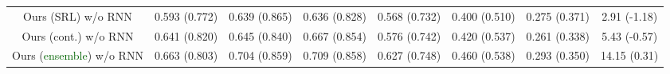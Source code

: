 \documentclass[11pt]{article}
\newcommand{\fone}{$\text{F}_1$\xspace}
\newcommand{\imrc}{iMRC\xspace}
\begin{document}
\begin{table*}
\begin{tabular}{c|ccc|ccc|c}
        Ours (SRL) w/o RNN                              & 0.593 \color{blue}(0.772) & 0.639 \color{blue}(0.865) & 0.636 \color{blue}(0.828) & 0.568 \color{blue}(0.732) & 0.400 \color{blue}(0.510) & 0.275 \color{blue}(0.371) & 2.91 \color{blue}(-1.18) \\
        Ours (cont.) w/o RNN                            & 0.641 \color{blue}(0.820) & 0.645 \color{blue}(0.840) & 0.667 \color{blue}(0.854) & 0.576 \color{blue}(0.742) & 0.420 \color{blue}(0.537) & 0.261 \color{blue}(0.338) & 5.43 \color{blue}(-0.57) \\
        Ours (\textcolor{darkgreen}{ensemble}) w/o RNN  & 0.663 \color{blue}(0.803) & 0.704 \color{blue}(0.859) & 0.709 \color{blue}(0.858) & 0.627 \color{blue}(0.748) & 0.460 \color{blue}(0.538) & 0.293 \color{blue}(0.350) & 14.15 \color{blue}(0.31) \\
        \bottomrule
    \end{tabular}
    \caption{\#Memory slot = 3. Testing \fone in \textbf{black} and sufficient information rewards in \textcolor{blue}{\textbf{blue}}. \%RI represents relative improvement over \imrc on corresponding metric, across settings.}
    \label{tab:result_table_full_slot_3}
\end{table*}
\end{document}
